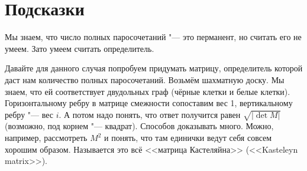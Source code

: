 \section{Подсказки}
	Мы знаем, что число полных паросочетаний "--- это перманент, но считать его не умеем.
	Зато умеем считать определитель.

	Давайте для данного случая попробуем придумать матрицу, определитель которой даст нам количество полных паросочетаний.
	Возьмём шахматную доску.
	Мы знаем, что ей соответствует двудольных граф (чёрные клетки и белые клетки).
	Горизонтальному ребру в матрице смежности сопоставим вес 1, вертикальному ребру "--- вес $i$.
	А потом надо понять, что ответ получится равен $\sqrt{|\det M|}$ (возможно, под корнем "--- квадрат).
	Способов доказывать много.
	Можно, например, рассмотреть $M^2$ и понять, что там единички ведут себя совсем хорошим образом.
	Называется это всё <<матрица Кастеляйна>> (<<Kasteleyn matrix>>).
